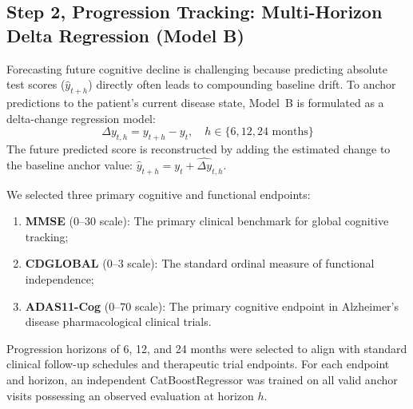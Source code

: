 \subsection{Step 2, Progression Tracking: Multi-Horizon Delta Regression (Model B)}
Forecasting future cognitive decline is challenging because predicting absolute test scores ($\hat{y}_{t+h}$) directly often leads to compounding baseline drift. To anchor predictions to the patient's current disease state, Model~B is formulated as a delta-change regression model:
\begin{equation}
    \Delta y_{t, h} = y_{t+h} - y_t, \quad h \in \{6, 12, 24\text{ months}\}
\end{equation}
The future predicted score is reconstructed by adding the estimated change to the baseline anchor value: $\hat{y}_{t+h} = y_t + \widehat{\Delta y}_{t, h}$.

We selected three primary cognitive and functional endpoints:
\begin{enumerate}
    \item \textbf{MMSE} ($0$--$30$ scale): The primary clinical benchmark for global cognitive tracking;
    \item \textbf{CDGLOBAL} ($0$--$3$ scale): The standard ordinal measure of functional independence;
    \item \textbf{ADAS11-Cog} ($0$--$70$ scale): The primary cognitive endpoint in Alzheimer's disease pharmacological clinical trials.
\end{enumerate}
Progression horizons of 6, 12, and 24 months were selected to align with standard clinical follow-up schedules and therapeutic trial endpoints. For each endpoint and horizon, an independent CatBoostRegressor was trained on all valid anchor visits possessing an observed evaluation at horizon $h$. 

